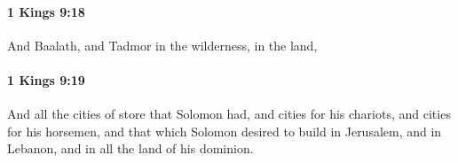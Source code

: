 		\paragraph{1 Kings 9:18} %
			\label{1KINGS-9-18}

			And Baalath, and Tadmor in the wilderness, in the land,


		\paragraph{1 Kings 9:19} %
			\label{1KINGS-9-19}

			And all the cities of store that Solomon had, and cities for his chariots, and cities for his horsemen, and that which Solomon desired to build in Jerusalem, and in Lebanon, and in all the land of his dominion.


